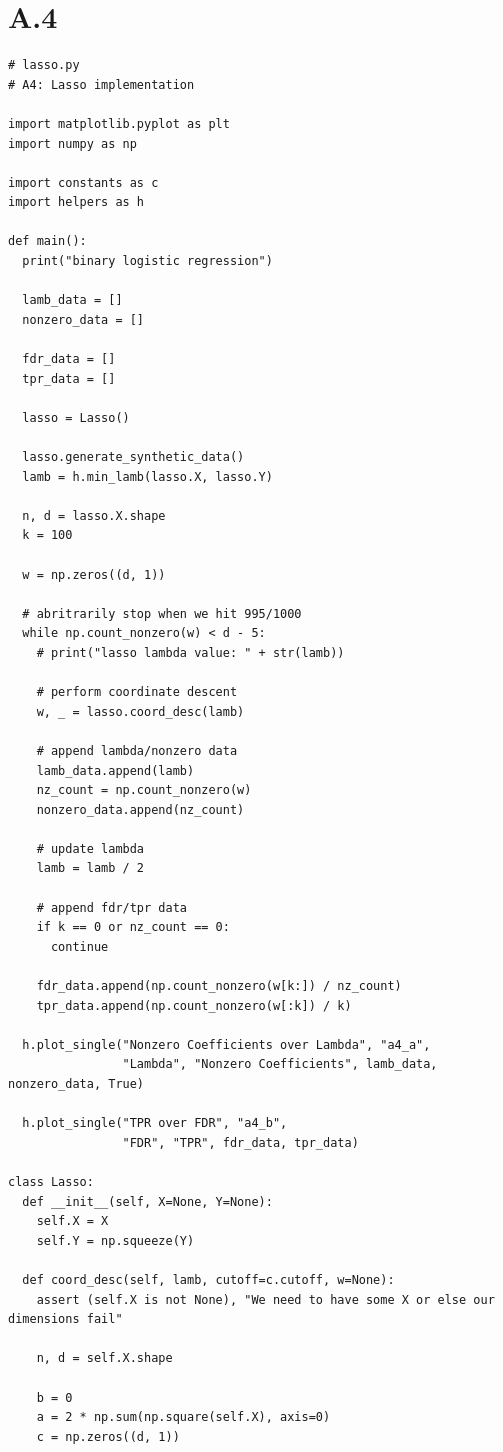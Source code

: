 \documentclass{article}
\newcommand{\1}{\mathbf{1}}
\begin{document}
\section*{A.4}
{\Large 

\begin{verbatim}
# lasso.py
# A4: Lasso implementation

import matplotlib.pyplot as plt
import numpy as np

import constants as c
import helpers as h

def main():
  print("binary logistic regression")

  lamb_data = []
  nonzero_data = []

  fdr_data = []
  tpr_data = []

  lasso = Lasso()

  lasso.generate_synthetic_data()
  lamb = h.min_lamb(lasso.X, lasso.Y)

  n, d = lasso.X.shape
  k = 100

  w = np.zeros((d, 1))

  # abritrarily stop when we hit 995/1000
  while np.count_nonzero(w) < d - 5:
    # print("lasso lambda value: " + str(lamb))

    # perform coordinate descent 
    w, _ = lasso.coord_desc(lamb)

    # append lambda/nonzero data
    lamb_data.append(lamb)
    nz_count = np.count_nonzero(w)
    nonzero_data.append(nz_count)

    # update lambda
    lamb = lamb / 2

    # append fdr/tpr data
    if k == 0 or nz_count == 0:
      continue

    fdr_data.append(np.count_nonzero(w[k:]) / nz_count)
    tpr_data.append(np.count_nonzero(w[:k]) / k)

  h.plot_single("Nonzero Coefficients over Lambda", "a4_a",
                "Lambda", "Nonzero Coefficients", lamb_data, nonzero_data, True)

  h.plot_single("TPR over FDR", "a4_b",
                "FDR", "TPR", fdr_data, tpr_data)

class Lasso:
  def __init__(self, X=None, Y=None):
    self.X = X
    self.Y = np.squeeze(Y)

  def coord_desc(self, lamb, cutoff=c.cutoff, w=None):
    assert (self.X is not None), "We need to have some X or else our dimensions fail"

    n, d = self.X.shape

    b = 0
    a = 2 * np.sum(np.square(self.X), axis=0)
    c = np.zeros((d, 1))


\end{verbatim}}
\end{document}

